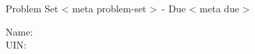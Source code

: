 \begin{center}
\Large{Problem Set {{< meta problem-set >}}~- Due {{< meta due >}} }
\end{center}
Name:\\
UIN: